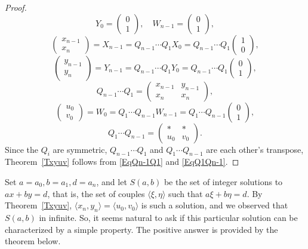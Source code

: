 \documentclass[12pt,letterpaper]{article}
\theoremstyle{definition}
\begin{document}
\begin{proof}[Proof]
$$Y_0=\begin{pmatrix} 0 \\ 1 \end{pmatrix}, \quad 
W_{n-1}=\begin{pmatrix} 0 \\ 1 \end{pmatrix},
$$ 
$$
\begin{pmatrix} x_{n-1} \\ x_n \end{pmatrix} = X_{n-1} = Q_{n-1} \cdots Q_1 X_0 
%
= Q_{n-1} \cdots Q_1 \begin{pmatrix} 1 \\ 0 \end{pmatrix}, 
$$ 
$$ 
\begin{pmatrix} y_{n-1} \\ y_n \end{pmatrix} = Y_{n-1} = Q_{n-1} \cdots Q_1 Y_0 
%
= Q_{n-1} \cdots Q_1 \begin{pmatrix} 0 \\ 1 \end{pmatrix}, 
$$ 
\begin{equation}\label{EqQn-1Q1}
Q_{n-1} \cdots Q_1 = \begin{pmatrix} x_{n-1} & y_{n-1} \\ x_n & x_n \end{pmatrix},
\end{equation} 
$$ 
\begin{pmatrix} u_0 \\ v_0 \end{pmatrix} = W_0 = Q_1 \cdots Q_{n-1} W_{n-1} 
%
= Q_1 \cdots Q_{n-1} \begin{pmatrix} 0 \\ 1 \end{pmatrix}, 
$$ 
\begin{equation}\label{EqQ1Qn-1}
Q_1 \cdots Q_{n-1} = \begin{pmatrix} * & * \\ u_0 & v_0 \end{pmatrix}.
\end{equation} 
Since the $Q_i$ are symmetric, $Q_{n-1} \cdots Q_1$ and $Q_1 \cdots Q_{n-1}$ are each other's transpose, Theorem~\ref{Txyuv} follows from \eqref{EqQn-1Q1} and \eqref{EqQ1Qn-1}. 
\end{proof} 

Set $a=a_0, b=a_1, d=a_n$, and let $S(a,b)$ be the set of integer solutions to $ax+by=d$, that is, the set of couples $\langle\xi,\eta\rangle$ such that $a\xi+b\eta=d$. By Theorem~\ref{Txyuv}, $\langle x_n,y_n\rangle=\langle u_0,v_0\rangle$ is such a solution, and we observed that $S(a,b)$ in infinite. So, it seems natural to ask if this particular solution can be characterized by a simple property. The positive answer is provided by the theorem below. 
\end{document}

